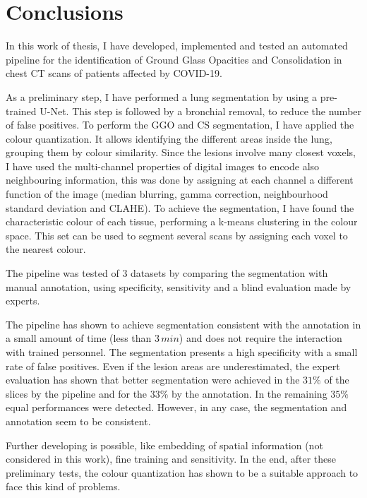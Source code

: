 \documentclass{standalone}
\begin{document}
	\chapter*{Conclusions}
		
	In this work of thesis, I have developed, implemented and tested an automated pipeline for the identification of Ground Glass Opacities and Consolidation in chest CT scans of patients affected by COVID-19. 

	As a preliminary step, I have performed a lung segmentation by using a pre-trained U-Net. This step is followed by a bronchial removal, to reduce the number of false positives. To perform the GGO and CS segmentation, I have applied the colour quantization. It allows identifying the different areas inside the lung, grouping them by colour similarity. Since the lesions involve many closest voxels, I have used the multi-channel properties of digital images to encode also neighbouring information, this was done by assigning at each channel a different function of the image (median blurring, gamma correction, neighbourhood standard deviation and CLAHE). To achieve the segmentation, I have found the characteristic colour of each tissue, performing a k-means clustering in the colour space. This set can be used to segment several scans by assigning each voxel to the nearest colour.

	The pipeline was tested of $3$ datasets by comparing the segmentation with manual annotation, using specificity, sensitivity and a blind evaluation made by experts. 

	The pipeline has shown to achieve segmentation consistent with the annotation in a small amount of time (less than $3\,min$) and does not require the interaction with trained personnel. The segmentation presents a high specificity with a small rate of false positives. Even if the lesion areas are underestimated, the expert evaluation has shown that better segmentation were achieved in the $31\%$ of the slices by the pipeline and for the $33\%$ by the annotation. In the remaining $35\%$ equal performances were detected. However, in any case, the segmentation and annotation seem to be consistent.


	Further developing is possible, like embedding of spatial information (not considered in this work), fine training and sensitivity. 
	In the end, after these preliminary tests, the colour quantization has shown to be a suitable approach to face this kind of problems. 
	
\end{document}
